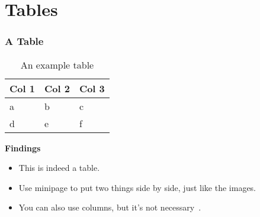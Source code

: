 \documentclass[
	11pt, %
	aspectratio=169, %
]{beamer}
\begin{document}
{
\begin{frame}[plain]
\end{frame}
}

\section{Tables}
\begin{frame}
  \frametitle{A Table}
  \centering
  \begin{minipage}{0.3\linewidth}
    \begin{table}
      \centering
      {\small
      \begin{tabular}[c]{lll}
      \toprule
      \textbf{Col 1} & \textbf{Col 2} & \textbf{Col 3} \\ \midrule
      a & b & c \\
      d & e & f \\
      \bottomrule
      \end{tabular}
      }
      \caption{An example table}
      \label{tab:}
    \end{table}
  \end{minipage}
  \begin{minipage}{0.6\linewidth}
    \textbf{Findings}\par
    \begin{itemize}
      \item This is indeed a table.
      \item Use minipage to put two things side by side, just like the images.
      \item You can also use columns, but it's not necessary~\cite{scharrerAnswerMinipageColumns2011}.
    \end{itemize}
  \end{minipage}
\end{frame}
\end{document}
